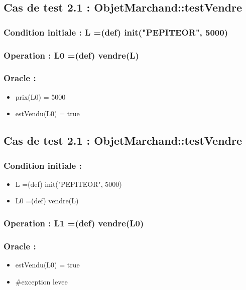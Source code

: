 \documentclass[11pt]{article}
\begin{document}
\subsection{Cas de test 2.1 : ObjetMarchand::testVendre}
\label{sec-1.4}

\subsubsection{Condition initiale : L =(def) init("PEPITEOR", 5000)}
\label{sec-1.4.1}

\subsubsection{Operation : L0 =(def) vendre(L)}
\label{sec-1.4.2}

\subsubsection{Oracle :}
\label{sec-1.4.3}

\begin{itemize}

\item prix(L0) = 5000\\
\label{sec-1.4.3.1}


\item estVendu(L0) = true\\
\label{sec-1.4.3.2}


\end{itemize} %
\subsection{Cas de test 2.1 : ObjetMarchand::testVendre}
\label{sec-1.5}

\subsubsection{Condition initiale :}
\label{sec-1.5.1}

\begin{itemize}

\item L =(def) init("PEPITEOR", 5000)\\
\label{sec-1.5.1.1}


\item L0 =(def) vendre(L)\\
\label{sec-1.5.1.2}

\end{itemize} %
\subsubsection{Operation : L1 =(def) vendre(L0)}
\label{sec-1.5.2}

\subsubsection{Oracle :}
\label{sec-1.5.3}

\begin{itemize}

\item estVendu(L0) = true\\
\label{sec-1.5.3.1}


\item \#exception levee\\
\label{sec-1.5.3.2}

\end{itemize} %
\end{document}
